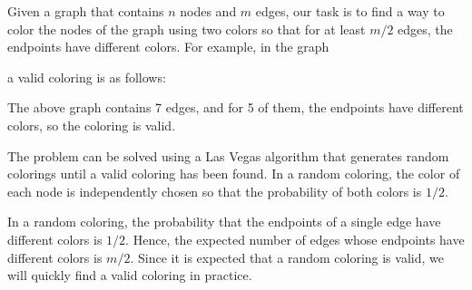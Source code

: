 Given a graph that contains $n$ nodes and $m$ edges,
our task is to find a way to color the nodes
of the graph using two colors so that
for at least $m/2$ edges, the endpoints 
have different colors.
For example, in the graph
\begin{center}
\end{center}
a valid coloring is as follows:
\begin{center}
\end{center}
The above graph contains 7 edges, and for 5 of them,
the endpoints have different colors,
so the coloring is valid.

The problem can be solved using a Las Vegas algorithm
that generates random colorings until a valid coloring
has been found.
In a random coloring, the color of each node is
independently chosen so that the probability of
both colors is $1/2$.

In a random coloring, the probability that the endpoints
of a single edge have different colors is $1/2$.
Hence, the expected number of edges whose endpoints
have different colors is $m/2$.
Since it is expected that a random coloring is valid,
we will quickly find a valid coloring in practice.

